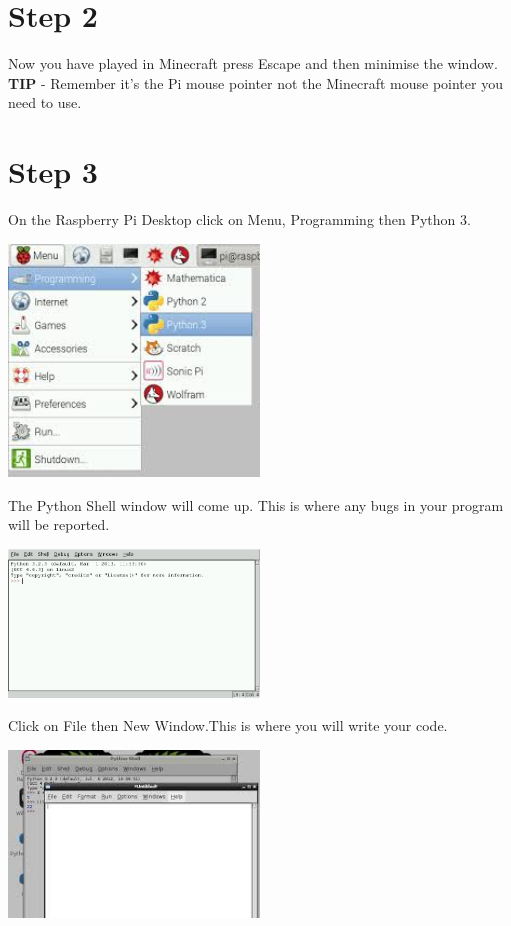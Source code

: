 \documentclass{geocraft-worksheet-multipage}
\begin{document}
\section*{Step 2}

Now you have played in Minecraft press Escape and then minimise the
window.\\ \vspace{0.4cm}
\textbf{TIP} - Remember it’s the Pi mouse pointer not the Minecraft
mouse pointer you need to use.

\section*{Step 3}

On the Raspberry Pi Desktop click on Menu, Programming then Python
3. \vspace{0.4cm} 

\includegraphics[width=0.5\textwidth]{pic3}\vspace{0.4cm}

The Python Shell window will come up. This is where any bugs in your
program will be reported. \vspace{0.4cm}

\includegraphics[width=0.5\textwidth]{pic4}\vspace{0.4cm}

Click on File then New Window.This is where you will write your
code.\vspace{0.4cm}

\includegraphics[width=0.5\textwidth]{pic5}\vspace{0.4cm}
\end{document}
